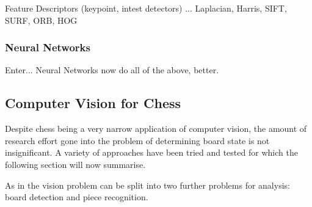 Feature Descriptors (keypoint, intest detectors) ... Laplacian, Harris, SIFT, SURF, ORB, HOG


\subsubsection{Neural Networks}
Enter...  Neural Networks now do all of the above, better.



\subsection{Computer Vision for Chess}
Despite chess being a very narrow application of computer vision, the amount of research effort gone into the problem of determining 
board state is not insignificant. 
A variety of approaches have been tried and tested for which the following section will now summarise.

As in \cite{Ding2016ChessVisionC} the vision problem can be split into two further problems for analysis: board detection and piece recognition.

